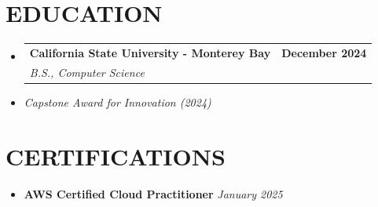 \documentclass[letterpaper,10pt]{article}
\makeatletter
\newcommand{\resumeSubHeadingListStart}{\begin{itemize}[leftmargin=0in,label={}]}
\newcommand{\resumeSubHeadingListEnd}{\end{itemize}}
\newcommand{\resumeSubheading}[4]{%
  \vspace{-2pt}\item
  \begin{tabular*}{\textwidth}[t]{l@{\extracolsep{\fill}}r}
    \textbf{\large #1} & \textbf{\small #2} \\
    \textit{\large #3} & \textit{\small #4} \\
  \end{tabular*}\vspace{-2pt}
}
\makeatother
\begin{document}
\vspace{6pt}

\section{EDUCATION}
\vspace{8pt}
\resumeSubHeadingListStart
  \resumeSubheading
    {California State University - Monterey Bay}{December 2024}
    {B.S., Computer Science}{}
  \item \small{\textit{Capstone Award for Innovation (2024)}}
\resumeSubHeadingListEnd

\vspace{6pt}

\section{CERTIFICATIONS}
\resumeSubHeadingListStart
\vspace{10pt}
\item \small{\textbf{AWS Certified Cloud Practitioner} \hfill \textit{January 2025}}
\resumeSubHeadingListEnd
\end{document}
